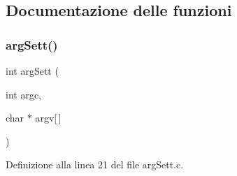 \subsection{Documentazione delle funzioni}
\mbox{\label{a00005_a169605f11035e9caf2dd6f0479c2dc18}} 
\subsubsection{\texorpdfstring{argSett()}{argSett()}}
{\footnotesize\ttfamily int arg\+Sett (\begin{DoxyParamCaption}\item[{int}]{argc,  }\item[{char $\ast$}]{argv\mbox{[}$\,$\mbox{]} }\end{DoxyParamCaption})}



Definizione alla linea 21 del file arg\+Sett.\+c.

